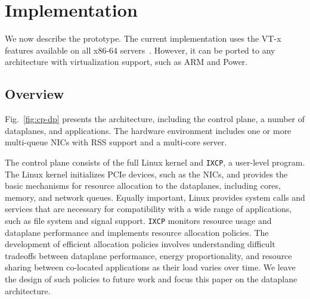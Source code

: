 
\section{\ix Implementation}
\label{sec:impl}



We now describe the \ix prototype.  The current implementation uses
the VT-x features available on all x86-64
servers~\cite{DBLP:journals/computer/UhligNRSMABKLS05}. However, it can
be ported to any architecture with virtualization support, such as ARM
and Power.




\subsection{Overview}
\label{sec:impl:overview}

Fig.~\ref{fig:cp-dp} presents the \ix architecture, including the
control plane, a number of dataplanes, and applications. The hardware
environment includes one or more multi-queue NICs with RSS support and
a multi-core server.

The \ix control plane consists of the full Linux kernel and
\texttt{IXCP}, a user-level program. The Linux kernel initializes PCIe
devices, such as the NICs, and provides the basic mechanisms for
resource allocation to the dataplanes, including cores, memory, and
network queues. Equally important, Linux provides
system calls and services that are necessary for compatibility with a wide
range of applications, such as file system and signal
support. \texttt{IXCP} monitors resource usage and dataplane
performance and implements resource allocation policies. The
development of efficient allocation policies involves understanding
difficult tradeoffs between dataplane performance, energy
proportionality, and resource sharing between co-located applications
as their load varies over time.  We leave the design of such policies
to future work and focus this paper on the \ix dataplane architecture.

